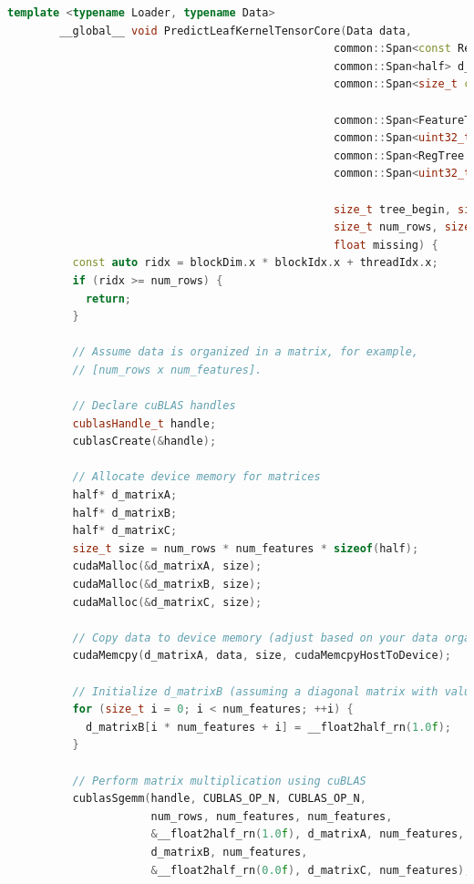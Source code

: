 \documentclass[14pt, a4paper]{extreport}
\begin{document}
    \begin{lstlisting}[language=C++, label={lst:xgboost_tensor_kernel_calculation}]
        template <typename Loader, typename Data>
        __global__ void PredictLeafKernelTensorCore(Data data,
                                                  common::Span<const RegTree::Node> d_nodes,
                                                  common::Span<half> d_out_predictions,
                                                  common::Span<size_t const> d_tree_segments,

                                                  common::Span<FeatureType const> d_tree_split_types,
                                                  common::Span<uint32_t const> d_cat_tree_segments,
                                                  common::Span<RegTree::CategoricalSplitMatrix::Segment const> d_cat_node_segments,
                                                  common::Span<uint32_t const> d_categories,

                                                  size_t tree_begin, size_t tree_end, size_t num_features,
                                                  size_t num_rows, size_t entry_start, bool use_shared,
                                                  float missing) {
          const auto ridx = blockDim.x * blockIdx.x + threadIdx.x;
          if (ridx >= num_rows) {
            return;
          }

          // Assume data is organized in a matrix, for example,
          // [num_rows x num_features].

          // Declare cuBLAS handles
          cublasHandle_t handle;
          cublasCreate(&handle);

          // Allocate device memory for matrices
          half* d_matrixA;
          half* d_matrixB;
          half* d_matrixC;
          size_t size = num_rows * num_features * sizeof(half);
          cudaMalloc(&d_matrixA, size);
          cudaMalloc(&d_matrixB, size);
          cudaMalloc(&d_matrixC, size);

          // Copy data to device memory (adjust based on your data organization)
          cudaMemcpy(d_matrixA, data, size, cudaMemcpyHostToDevice);

          // Initialize d_matrixB (assuming a diagonal matrix with values of 1.0f)
          for (size_t i = 0; i < num_features; ++i) {
            d_matrixB[i * num_features + i] = __float2half_rn(1.0f);
          }

          // Perform matrix multiplication using cuBLAS
          cublasSgemm(handle, CUBLAS_OP_N, CUBLAS_OP_N,
                      num_rows, num_features, num_features,
                      &__float2half_rn(1.0f), d_matrixA, num_features,
                      d_matrixB, num_features,
                      &__float2half_rn(0.0f), d_matrixC, num_features);


\end{lstlisting}
\end{document}
